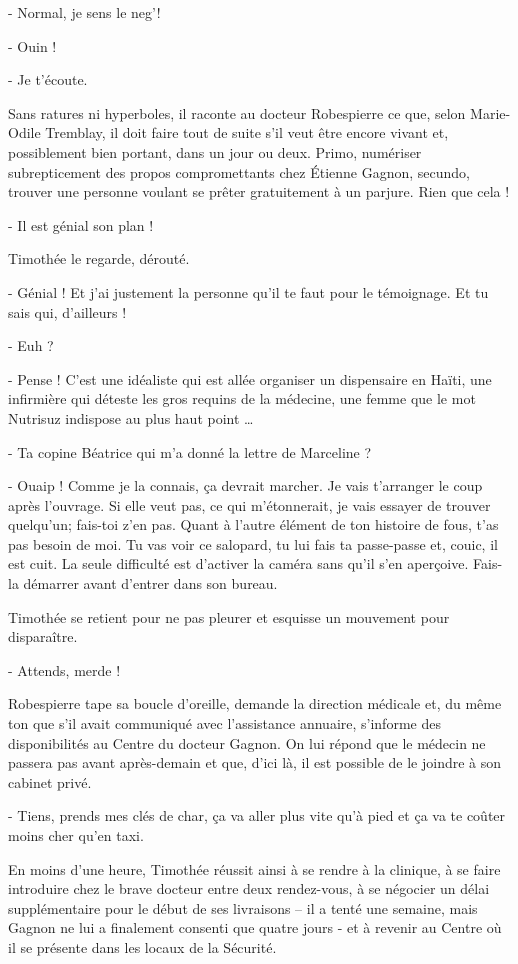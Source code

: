 - Normal, je sens le neg’!

- Ouin !

- Je t’écoute.

Sans ratures ni hyperboles, il raconte au docteur Robespierre ce que, selon Marie-Odile Tremblay, il doit faire tout de suite s’il veut être encore vivant et, possiblement bien portant, dans un jour ou deux. Primo, numériser subrepticement des propos compromettants chez Étienne Gagnon, secundo, trouver une personne voulant se prêter gratuitement à un parjure. Rien que cela !

- Il est génial son plan !

Timothée le regarde, dérouté.

- Génial ! Et j’ai justement la personne qu’il te faut pour le témoignage. Et tu sais qui, d’ailleurs !

- Euh ?

- Pense ! C’est une idéaliste qui est allée organiser un dispensaire en Haïti, une infirmière qui déteste les gros requins de la médecine, une femme que le mot Nutrisuz indispose au plus haut point …

- Ta copine Béatrice qui m’a donné la lettre de Marceline ?

- Ouaip ! Comme je la connais, ça devrait marcher. Je vais t’arranger le coup après l’ouvrage. Si elle veut pas, ce qui m’étonnerait, je vais essayer de trouver quelqu’un; fais-toi z’en pas. Quant à l’autre élément de ton histoire de fous, t’as pas besoin de moi. Tu vas voir ce salopard, tu lui fais ta passe-passe et, couic, il est cuit. La seule difficulté est d’activer la caméra sans qu’il s’en aperçoive. Fais-la démarrer avant d’entrer dans son bureau.

Timothée se retient pour ne pas pleurer et esquisse un mouvement pour disparaître.

- Attends, merde !

Robespierre tape sa boucle d’oreille, demande la direction médicale et, du même ton que s’il avait communiqué avec l’assistance annuaire, s’informe des disponibilités au Centre du docteur Gagnon. On lui répond que le médecin ne passera pas avant après-demain et que, d’ici là, il est possible de le joindre à son cabinet privé.

- Tiens, prends mes clés de char, ça va aller plus vite qu’à pied et ça va te coûter moins cher qu’en taxi.

En moins d’une heure, Timothée réussit ainsi à se rendre à la clinique, à se faire introduire chez le brave docteur entre deux rendez-vous, à se négocier un délai supplémentaire pour le début de ses livraisons – il a tenté une semaine, mais Gagnon ne lui a finalement consenti que quatre jours - et à revenir au Centre où il se présente dans les locaux de la Sécurité.

